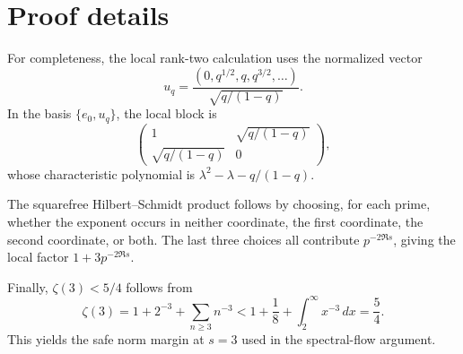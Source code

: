 \section{Proof details}

For completeness, the local rank-two calculation uses the normalized vector
\[
 u_q=\frac{(0,q^{1/2},q,q^{3/2},\ldots)}{\sqrt{q/(1-q)}}.
\]
In the basis \(\{e_0,u_q\}\), the local block is
\[
 \begin{pmatrix}1&\sqrt{q/(1-q)}\\
 \sqrt{q/(1-q)}&0\end{pmatrix},
\]
whose characteristic polynomial is \(\lambda^2-\lambda-q/(1-q)\).

The squarefree Hilbert--Schmidt product follows by choosing, for each prime,
whether the exponent occurs in neither coordinate, the first coordinate, the
second coordinate, or both.  The last three choices all contribute
\(p^{-2\Re s}\), giving the local factor \(1+3p^{-2\Re s}\).

Finally, \(\zeta(3)<5/4\) follows from
\[
 \zeta(3)=1+2^{-3}+\sum_{n\ge3}n^{-3}<1+\frac18+\int_2^\infty x^{-3}\,dx=\frac54.
\]
This yields the safe norm margin at \(s=3\) used in the spectral-flow
argument.
